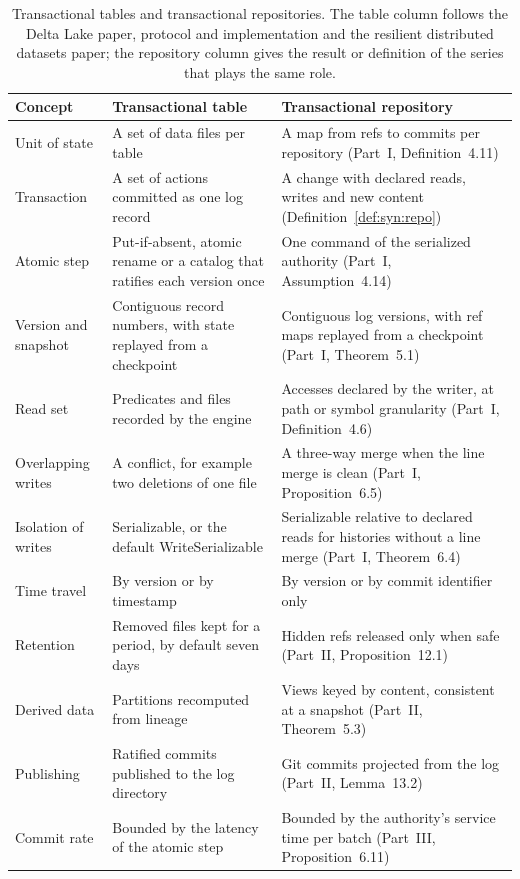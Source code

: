 \documentclass[11pt,letterpaper]{article}
\theoremstyle{definition}
\theoremstyle{remark}
\begin{document}
\begin{table}[t]
\centering
\small
\caption{Transactional tables and transactional repositories. The table column follows the Delta Lake paper, protocol and implementation and the resilient distributed datasets paper; the repository column gives the result or definition of the series that plays the same role.}
\label{tab:syn:correspondence}
\begin{tabularx}{\textwidth}{@{}L{2.4cm}YY@{}}
\toprule
Concept & Transactional table & Transactional repository \\
\midrule
Unit of state & A set of data files per table & A map from refs to commits per repository (Part~I, Definition~4.11) \\
Transaction & A set of actions committed as one log record & A change with declared reads, writes and new content (Definition~\ref{def:syn:repo}) \\
Atomic step & Put-if-absent, atomic rename or a catalog that ratifies each version once & One command of the serialized authority (Part~I, Assumption~4.14) \\
Version and snapshot & Contiguous record numbers, with state replayed from a checkpoint & Contiguous log versions, with ref maps replayed from a checkpoint (Part~I, Theorem~5.1) \\
Read set & Predicates and files recorded by the engine & Accesses declared by the writer, at path or symbol granularity (Part~I, Definition~4.6) \\
Overlapping writes & A conflict, for example two deletions of one file & A three-way merge when the line merge is clean (Part~I, Proposition~6.5) \\
Isolation of writes & Serializable, or the default WriteSerializable & Serializable relative to declared reads for histories without a line merge (Part~I, Theorem~6.4) \\
Time travel & By version or by timestamp & By version or by commit identifier only \\
Retention & Removed files kept for a period, by default seven days & Hidden refs released only when safe (Part~II, Proposition~12.1) \\
Derived data & Partitions recomputed from lineage & Views keyed by content, consistent at a snapshot (Part~II, Theorem~5.3) \\
Publishing & Ratified commits published to the log directory & Git commits projected from the log (Part~II, Lemma~13.2) \\
Commit rate & Bounded by the latency of the atomic step & Bounded by the authority's service time per batch (Part~III, Proposition~6.11) \\
\bottomrule
\end{tabularx}
\end{table}
\end{document}

